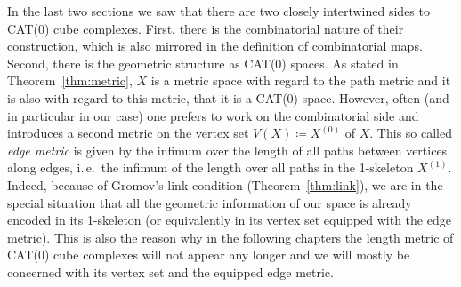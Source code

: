 

\begin{rem}
  In the last two sections we saw that there are two closely intertwined sides to CAT(0) cube complexes. First, there is the combinatorial nature of their construction, which is also mirrored in the definition of combinatorial maps. Second, there is the geometric structure as CAT(0) spaces. As stated in Theorem~\ref{thm:metric}, \(X\) is a metric space with regard to the path metric and it is also with regard to this metric, that it is a CAT(0) space. However, often (and in particular in our case) one prefers to work on the combinatorial side and introduces a second metric on the vertex set \(V(X) \coloneqq X^{(0)}\)  of \(X\). This so called \emph{edge metric} is given by the infimum over the length of all paths between vertices along edges, i.\,e.\ the infimum of the length over all paths in the 1-skeleton \(X^{(1)}\). Indeed, because of Gromov's link condition (Theorem~\ref{thm:link}), we are in the special situation that all the geometric information of our space is already encoded in its 1-skeleton (or equivalently in its vertex set equipped with the edge metric). This is also the reason why in the following chapters the length metric of CAT(0) cube complexes will not appear any longer and we will mostly be concerned with its vertex set and the equipped edge metric.
\end{rem}

